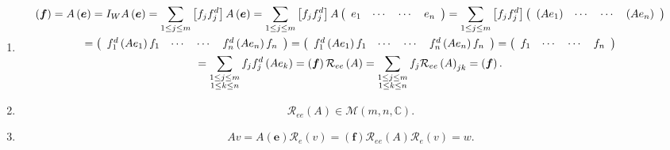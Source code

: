 \documentclass[aps,preprint]{revtex4}%
\begin{document}
\begin{enumerate}
\begin{enumerate}
\item
\begin{gather}
\left(  \boldsymbol{f}\right)  =A\left(  \boldsymbol{e}\right)  =I_{W}A\left(
\boldsymbol{e}\right)  =\sum_{1\leq j\leq m}\left[  f_{j}f_{j}^{d}\right]
A\left(  \boldsymbol{e}\right)  =\sum_{1\leq j\leq m}\left[  f_{j}f_{j}%
^{d}\right]  A\left(
\begin{array}
[c]{cccc}%
e_{1} & \cdots & \cdots & e_{n}%
\end{array}
\right)  =\sum_{1\leq j\leq m}\left[  f_{j}f_{j}^{d}\right]  \left(
\begin{array}
[c]{cccc}%
\left(  Ae_{1}\right)  & \cdots & \cdots & \left(  Ae_{n}\right)
\end{array}
\right) \\
=\left(
\begin{array}
[c]{cccc}%
f_{1}^{d}\left(  Ae_{1}\right)  f_{1} & \cdots & \cdots & f_{n}^{d}\left(
Ae_{n}\right)  f_{n}%
\end{array}
\right)  =\left(
\begin{array}
[c]{cccc}%
f_{1}^{d}\left(  Ae_{1}\right)  f_{1} & \cdots & \cdots & f_{n}^{d}\left(
Ae_{n}\right)  f_{n}%
\end{array}
\right)  =\left(
\begin{array}
[c]{cccc}%
f_{1} & \cdots & \cdots & f_{n}%
\end{array}
\right) \\
=\sum_{\substack{1\leq j\leq m\\1\leq k\leq n}}f_{j}f_{j}^{d}\left(
Ae_{k}\right)  =\left(  \boldsymbol{f}\right)  \mathcal{R}_{ee}\left(
A\right)  =\sum_{\substack{1\leq j\leq m\\1\leq k\leq n}}f_{j}\mathcal{R}%
_{ee}\left(  A\right)  _{jk}=\left(  \boldsymbol{f}\right)  .
\end{gather}


\item
\begin{equation}
\mathcal{R}_{ee}\left(  A\right)  \in\mathcal{M}\left(  m,n,\mathbb{C}\right)
.
\end{equation}


\item
\begin{equation}
Av=A\left(  \boldsymbol{e}\right)  \mathcal{R}_{e}\left(  v\right)  =\left(
\boldsymbol{f}\right)  \mathcal{R}_{ee}\left(  A\right)  \mathcal{R}%
_{e}\left(  v\right)  =w.
\end{equation}



\end{enumerate}
\end{enumerate}
\end{document}
